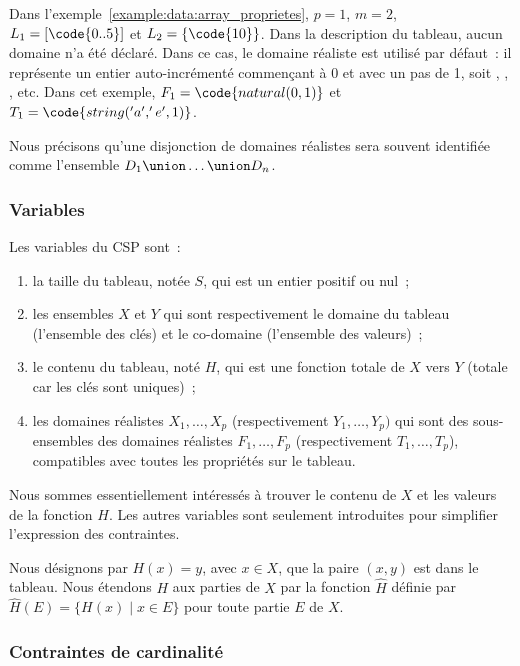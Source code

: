 Dans l'exemple~\ref{example:data:array_proprietes}, $p = 1$, $m = 2$, $L_1 =
[\code{0..5}]$ et $L_2 = \{\code{10}\}$. Dans la description du tableau, aucun
domaine n'a été déclaré. Dans ce cas, le domaine réaliste 
est utilisé par défaut~: il représente un entier auto-incrémenté commençant à 0
et avec un pas de 1, soit , , ,  etc. Dans cet
exemple, $F_1 = \code{natural(0, 1)}$ et $T_1 = \code{string('a', 'e', 1)}$.

Nous précisons qu'une disjonction de domaines réalistes  sera souvent identifiée comme l'ensemble $D_1 \union \dots \union
D_n$.

\subsubsection{Variables}

Les variables du CSP sont~:
%
\begin{enumerate}

\item la taille du tableau, notée $S$, qui est un entier positif ou nul~;

\item les ensembles $X$ et $Y$ qui sont respectivement le domaine du tableau
(l'ensemble des clés) et le co-domaine (l'ensemble des valeurs)~;

\item le contenu du tableau, noté $H$, qui est une fonction totale de $X$ vers
$Y$ (totale car les clés sont uniques)~;

\item les domaines réalistes $X_1, \dots, X_p$ (respectivement $Y_1, \dots,
Y_p)$ qui sont des sous-ensembles des domaines réalistes $F_1, \dots, F_p$
(respectivement $T_1, \dots, T_p$), compatibles avec toutes les propriétés sur
le tableau.

\end{enumerate}

Nous sommes essentiellement intéressés à trouver le contenu de $X$ et les
valeurs de la fonction $H$. Les autres variables sont seulement introduites pour
simplifier l'expression des contraintes.

Nous désignons par $H(x) = y$, avec $x \in X$, que la paire $(x, y)$ est dans le
tableau. Nous étendons $H$ aux parties de $X$ par la fonction $\hat{H}$ définie
par $\hat{H}(E) = \{H(x) \;\vert\; x \in E\}$ pour toute partie $E$ de $X$.

\subsubsection{Contraintes de cardinalité}

